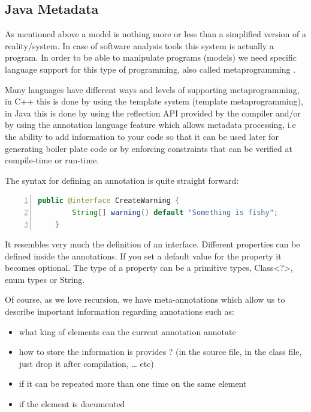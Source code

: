 		
\subsection{Java Metadata}

	
	As mentioned above a model is nothing more or less than a simplified version of
a reality/system. In case of software analysis tools this system is actually a
program. In order to be able to manipulate programs (models) we need specific
language support for this type of programming, also called metaprogramming
\cite{website:metaprogramming}. 

	Many languages have different ways and levels of supporting metaprogramming,
in C++ this is done by using the template system (template metaprogramming), in
Java this is done by using the reflection API provided by the compiler and/or by using the annotation
language feature which allows metadata processing, i.e the ability to add
information to your code so that it can be used later for generating boiler
plate code or by enforcing constraints that can be verified at compile-time or
run-time. \cite{book:ThinkingInJava} 
	
	The syntax for defining an annotation is quite straight forward:
	\small
	\begin{lstlisting}[language=Java,numbers=left]
	public @interface CreateWarning {
		String[] warning() default "Something is fishy"; 
	}
	\end{lstlisting}
	\normalsize{}
	
	It resembles very much the definition of an interface. 
Different properties can be defined inside the annotations. If you set a default
value for the property it becomes optional. The type of a property can be a
primitive types, Class<?>, enum types or String.
 
	Of course, as we love recursion, we have meta-annotations which
allow us to describe important information regarding annotations such as:
	\begin{itemize}
	 	\item what king of elements can the current annotation annotate
	 	\item how to store the information is provides ? (in the source file, in the
class file, just drop it after compilation, \ldots{} etc)
	 	\item if it can be repeated more than one time on the same element
	 	\item if the element is  documented
	\end{itemize}
	
